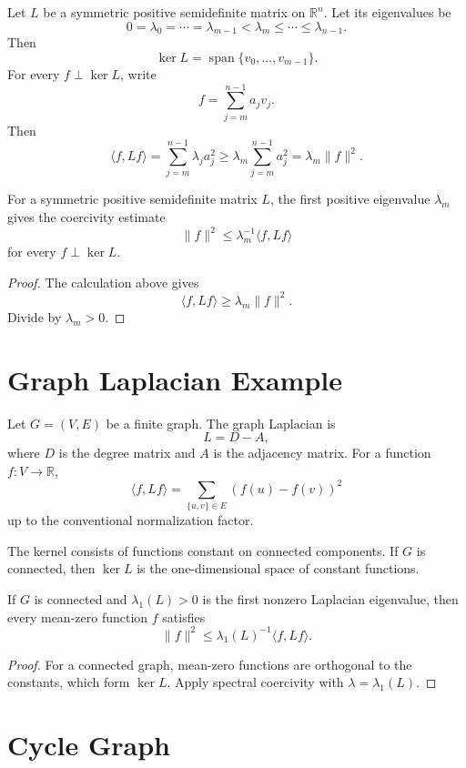 Let \(L\) be a symmetric positive semidefinite matrix on \(\mathbb R^n\). Let
its eigenvalues be
\[
0=\lambda_0=\cdots=\lambda_{m-1}<\lambda_m\le\cdots\le\lambda_{n-1}.
\]
Then
\[
\ker L=\operatorname{span}\{v_0,\ldots,v_{m-1}\}.
\]
For every \(f\perp\ker L\), write
\[
f=\sum_{j=m}^{n-1}a_j v_j.
\]
Then
\[
\langle f,Lf\rangle
=
\sum_{j=m}^{n-1}\lambda_j a_j^2
\ge
\lambda_m\sum_{j=m}^{n-1}a_j^2
=
\lambda_m\|f\|^2.
\]

\begin{theorem}
For a symmetric positive semidefinite matrix \(L\), the first positive
eigenvalue \(\lambda_m\) gives the coercivity estimate
\[
\|f\|^2\le \lambda_m^{-1}\langle f,Lf\rangle
\]
for every \(f\perp\ker L\).
\end{theorem}

\begin{proof}
The calculation above gives
\[
\langle f,Lf\rangle\ge\lambda_m\|f\|^2.
\]
Divide by \(\lambda_m>0\).
\end{proof}

\section{Graph Laplacian Example}

Let \(G=(V,E)\) be a finite graph. The graph Laplacian is
\[
L=D-A,
\]
where \(D\) is the degree matrix and \(A\) is the adjacency matrix. For a
function \(f:V\to\mathbb R\),
\[
\langle f,Lf\rangle
=
\sum_{\{u,v\}\in E}{(f(u)-f(v))}^2
\]
up to the conventional normalization factor.

The kernel consists of functions constant on connected components. If \(G\) is
connected, then \(\ker L\) is the one-dimensional space of constant functions.

\begin{theorem}
If \(G\) is connected and \(\lambda_1(L)>0\) is the first nonzero Laplacian
eigenvalue, then every mean-zero function \(f\) satisfies
\[
\|f\|^2\le {\lambda_1(L)}^{-1}\langle f,Lf\rangle.
\]
\end{theorem}

\begin{proof}
For a connected graph, mean-zero functions are orthogonal to the constants,
which form \(\ker L\). Apply spectral coercivity with
\(\lambda=\lambda_1(L)\).
\end{proof}

\section{Cycle Graph}

